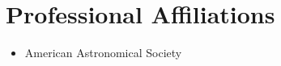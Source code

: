 %
%
%

\section{\texorpdfstring{\color{Blue}Professional Affiliations}{Professional Affiliations}}

\begin{itemize}
    \item American Astronomical Society
\end{itemize}
